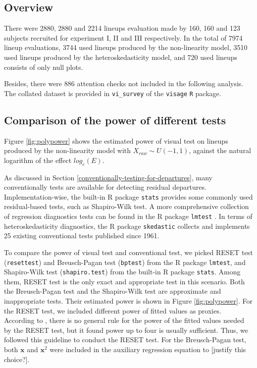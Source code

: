 \documentclass[]{interact}
\theoremstyle{plain}%
\theoremstyle{definition}
\theoremstyle{remark}
\begin{document}
\hypertarget{overview}{%
\subsection{Overview}\label{overview}}

There were 2880, 2880 and 2214 lineups evaluation made by 160, 160 and
123 subjects recruited for experiment I, II and III respectively. In the
total of 7974 lineup evaluations, 3744 used lineups produced by the
non-linearity model, 3510 used lineups produced by the
heteroskedasticity model, and 720 used lineups consists of only null
plots.

Besides, there were 886 attention checks not included in the following
analysis. The collated dataset is provided in \texttt{vi\_survey} of the
\texttt{visage} \texttt{R} package.

\hypertarget{comparison-of-the-power-of-different-tests}{%
\subsection{Comparison of the power of different
tests}\label{comparison-of-the-power-of-different-tests}}

Figure \ref{fig:polypower} shows the estimated power of visual test on
lineups produced by the non-linearity model with
\(X_{raw} \sim U(-1,1)\), against the natural logarithm of the effect
\(log_e(E)\).

As discussed in Section \ref{conventionally-testing-for-departures},
many conventionally tests are available for detecting residual
departures. Implementation-wise, the built-in R package \texttt{stats}
provides some commonly used residual-based tests, such as Shapiro-Wilk
test. A more comprehensive collection of regression diagnostics tests
can be found in the R package \texttt{lmtest} \citep{lmtest}. In terms
of heteroskedasticity diagnostics, the R package \texttt{skedastic}
\citep{skedastic} collects and implements 25 existing conventional tests
published since 1961.

To compare the power of visual test and conventional test, we picked
RESET test (\texttt{resettest}) and Breusch-Pagan test (\texttt{bptest})
from the R package \texttt{lmtest}, and Shapiro-Wilk test
(\texttt{shapiro.test}) from the built-in R package \texttt{stats}.
Among them, RESET test is the only exact and appropriate test in this
scenario. Both the Breusch-Pagan test and the Shapiro-Wilk test are
approximate and inappropriate tests. Their estimated power is shown in
Figure \ref{fig:polypower}. For the RESET test, we included different
power of fitted values as proxies. According to
\citet{ramsey_tests_1969}, there is no general rule for the power of the
fitted values needed by the RESET test, but it found power up to four is
usually sufficient. Thus, we followed this guideline to conduct the
RESET test. For the Breusch-Pagan test, both \(\boldsymbol{x}\) and
\(\boldsymbol{x}^2\) were included in the auxiliary regression equation
to {[}justify this choice?{]}.
\end{document}
